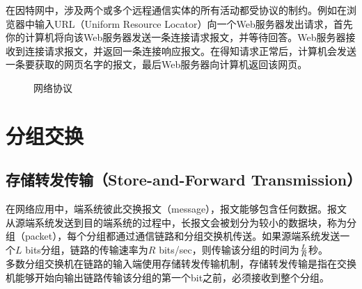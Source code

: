在因特网中，涉及两个或多个远程通信实体的所有活动都受协议的制约。例如在浏览器中输入URL（Uniform Resource Locator）向一个Web服务器发出请求，首先你的计算机将向该Web服务器发送一条连接请求报文，并等待回答。Web服务器接收到连接请求报文，并返回一条连接响应报文。在得知请求正常后，计算机会发送一条要获取的网页名字的报文，最后Web服务器向计算机返回该网页。\\

\begin{figure}[H]
    \centering
    \caption{网络协议}
\end{figure}

\newpage

\section{分组交换}

\subsection{存储转发传输（Store-and-Forward Transmission）}

在网络应用中，端系统彼此交换报文（message），报文能够包含任何数据。报文从源端系统发送到目的端系统的过程中，长报文会被划分为较小的数据块，称为分组（packet），每个分组都通过通信链路和分组交换机传送。如果源端系统发送一个$ L $ bits分组，链路的传输速率为$ R $ bits/sec，则传输该分组的时间为$ L \over R $秒。\\

多数分组交换机在链路的输入端使用存储转发传输机制，存储转发传输是指在交换机能够开始向输出链路传输该分组的第一个bit之前，必须接收到整个分组。\\

